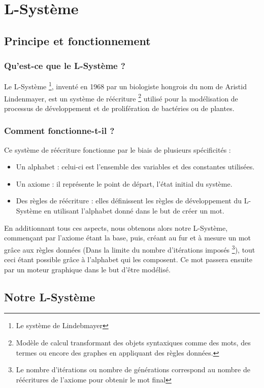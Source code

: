 \chapter{L-Système}

\section{Principe et fonctionnement}

\subsection{Qu'est-ce que le L-Système ?}
Le L-Système \footnote{Le système de Lindebmayer}, inventé en 1968 par un biologiste hongrois du nom de Aristid Lindenmayer, est un système de réécriture \footnote{Modèle de calcul transformant des objets syntaxiques comme des mots, des termes ou encore des graphes en appliquant des règles données.} utilisé pour la modélisation de processus de développement et de prolifération de bactéries ou de plantes.

\subsection{Comment fonctionne-t-il ?}
Ce système de réécriture fonctionne par le biais de plusieurs spécificités :
\begin{itemize}
    \item Un alphabet : celui-ci est l'ensemble des variables et des constantes utilisées.
    \item Un axiome : il représente le point de départ, l'état initial du système.
    \item Des règles de réécriture : elles définissent les règles de développement du L-Système en utilisant l'alphabet donné dans le but de créer un mot.
\end{itemize}
En additionnant tous ces aspects, nous obtenons alors notre L-Système, commençant par l'axiome étant la base, puis, créant au fur et à mesure un mot grâce aux règles données (Dans la limite du nombre d'itérations imposés \footnote{Le nombre d'itérations ou nombre de générations correspond au nombre de réécritures de l'axiome pour obtenir le mot final}), tout ceci étant possible grâce à l'alphabet qui les composent.
Ce mot passera ensuite par un moteur graphique dans le but d'être modélisé.

\section{Notre L-Système}

